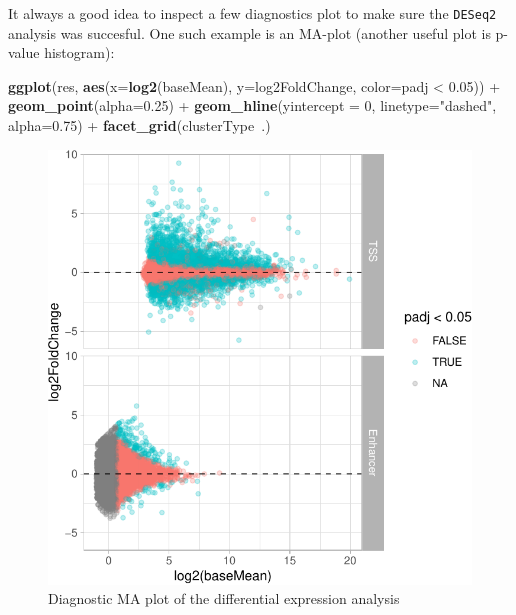 \documentclass[9pt,a4paper,]{extarticle}
\newenvironment{Shaded}{\begin{snugshade}}{\end{snugshade}}
\newcommand{\KeywordTok}[1]{\textcolor[rgb]{0.13,0.29,0.53}{\textbf{{#1}}}}
\newcommand{\DataTypeTok}[1]{\textcolor[rgb]{0.13,0.29,0.53}{{#1}}}
\newcommand{\DecValTok}[1]{\textcolor[rgb]{0.00,0.00,0.81}{{#1}}}
\newcommand{\FloatTok}[1]{\textcolor[rgb]{0.00,0.00,0.81}{{#1}}}
\newcommand{\StringTok}[1]{\textcolor[rgb]{0.31,0.60,0.02}{{#1}}}
\newcommand{\NormalTok}[1]{{#1}}
\begin{document}
It always a good idea to inspect a few diagnostics plot to make sure the \texttt{DESeq2} analysis was succesful. One such example is an MA-plot (another useful plot is p-value histogram):

\begin{Shaded}
\begin{Highlighting}[]
\KeywordTok{ggplot}\NormalTok{(res, }\KeywordTok{aes}\NormalTok{(}\DataTypeTok{x=}\KeywordTok{log2}\NormalTok{(baseMean), }\DataTypeTok{y=}\NormalTok{log2FoldChange, }\DataTypeTok{color=}\NormalTok{padj <}\StringTok{ }\FloatTok{0.05}\NormalTok{)) +}
\StringTok{    }\KeywordTok{geom_point}\NormalTok{(}\DataTypeTok{alpha=}\FloatTok{0.25}\NormalTok{) +}
\StringTok{    }\KeywordTok{geom_hline}\NormalTok{(}\DataTypeTok{yintercept =} \DecValTok{0}\NormalTok{, }\DataTypeTok{linetype=}\StringTok{"dashed"}\NormalTok{, }\DataTypeTok{alpha=}\FloatTok{0.75}\NormalTok{) +}
\StringTok{    }\KeywordTok{facet_grid}\NormalTok{(clusterType~.)}
\end{Highlighting}
\end{Shaded}

\begin{figure}

{\centering \includegraphics{CAGEWorkflow_files/figure-latex/diagnosticPlot-1} 

}

\caption{Diagnostic MA plot of the differential expression analysis}\label{fig:diagnosticPlot}
\end{figure}
\end{document}
